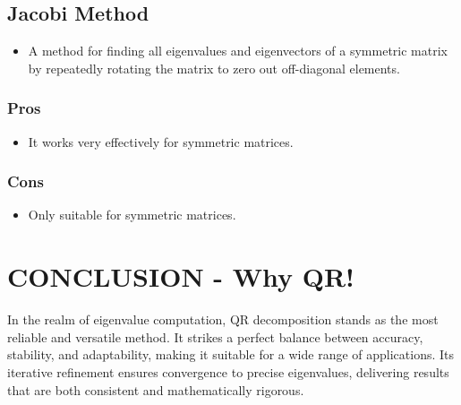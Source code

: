 \documentclass[journal]{IEEEtran}
\begin{document}
\subsection{Jacobi Method}
\begin{itemize}
    \item  A method for finding all eigenvalues and eigenvectors of a symmetric matrix by repeatedly rotating the matrix to zero out off-diagonal elements.\\
\end{itemize}
\subsubsection{Pros}
\begin{itemize}
    \item It works very effectively for symmetric matrices.
\end{itemize}
\subsubsection{Cons}
\begin{itemize}
    \item Only suitable for symmetric matrices.
\end{itemize}
\begin{table}[h!]
\centering
{}
\label{tab:eigenvalue_methods}
\end{table}
\section{CONCLUSION - Why QR!}
In the realm of eigenvalue computation, QR decomposition stands as the most reliable and versatile method. It strikes a perfect balance between accuracy, stability, and adaptability, making it suitable for a wide range of applications. Its iterative refinement ensures convergence to precise eigenvalues, delivering results that are both consistent and mathematically rigorous.
\end{document}
